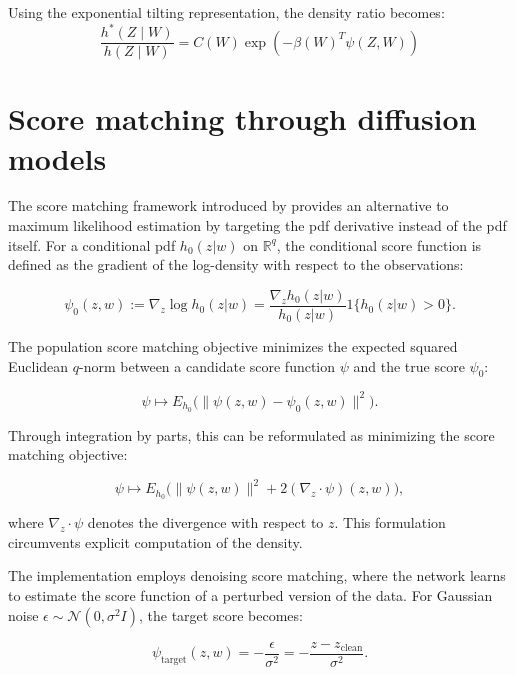 \documentclass[12pt]{article}
\theoremstyle{thmstyleone}%
\theoremstyle{thmstyletwo}%
\theoremstyle{thmstylethree}%
\begin{document}
Using the exponential tilting representation, the density ratio becomes:
\[
\frac{h^*(Z \mid W)}{h(Z \mid W)} =C(W){\exp\left(-\beta(W)^T \psi(Z,W)\right)}
\]

\section{Score matching through diffusion models}\label{app:diff}



The score matching framework  introduced by \cite{jmlrscore} provides an alternative to maximum likelihood estimation by targeting the pdf derivative instead of the pdf itself. For a conditional pdf $h_0(z|w)$ on $\mathbb{R}^q$, the conditional score function is defined as the gradient of the log-density with respect to the observations:

\begin{equation}
	\psi_0(z,w) := \nabla_z \log h_0(z|w) = \frac{\nabla_z h_0(z|w)}{h_0(z|w)} {1}{\{h_0(z|w) > 0\}}.
\end{equation}

The population score matching objective minimizes the expected squared Euclidean $q$-norm between a candidate score function $\psi$ and the true score $\psi_0$:

\begin{equation}
	\psi \longmapsto	{E}_{h_0}\big(\|\psi(z,w) - \psi_0(z,w)\|^2 \big).
\end{equation}

Through integration by parts, this can be reformulated as minimizing the score matching objective:

\begin{equation}
	\psi \longmapsto {E}_{h_0} \big( \|\psi(z,w)\|^2 + 2 (\nabla_z \cdot \psi)(z,w) \big),
\end{equation}

where $\nabla_z \cdot \psi$ denotes the divergence with respect to $z$. This formulation circumvents explicit computation of the density. 

The implementation employs denoising score matching, where the network learns to estimate the score function of a perturbed version of the data. For Gaussian noise $\epsilon \sim \mathcal{N}(0,\sigma^2 I)$, the target score becomes:

\begin{equation}
	\psi_{\text{target}}(z,w) = -\frac{\epsilon}{\sigma^2} = -\frac{z - z_{\text{clean}}}{\sigma^2}.
\end{equation}
\end{document}
